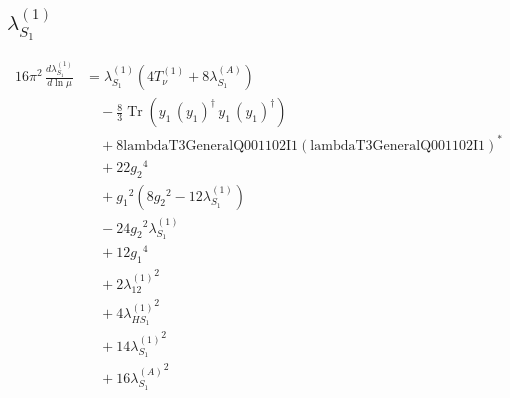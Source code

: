 \documentclass[10pt,a4paper]{article}
\begin{document}
\subsection*{$\lambda_{S_1}^{(1)}$}
\begin{align*}
16\pi^2\,\frac{d \lambda_{S_1}^{(1)}}{d\ln\mu} &={\lambda_{S_1}^{(1)}} (4 T_{\nu}^{(1)}+8 {\lambda_{S_1}^{(A)}}) \\
&\quad -\frac{8}{3} \operatorname{Tr}\!\left({y_1}\,\left({y_1}\right)^{\dagger}\,{y_1}\,\left({y_1}\right)^{\dagger}\right) \\
&\quad +8 \text{lambdaT3GeneralQ001102I1} \left(\text{lambdaT3GeneralQ001102I1}\right)^{*} \\
&\quad +22 {g_2}^4 \\
&\quad +{g_1}^2 \left(8 {g_2}^2-12 {\lambda_{S_1}^{(1)}}\right) \\
&\quad -24 {g_2}^2 {\lambda_{S_1}^{(1)}} \\
&\quad +12 {g_1}^4 \\
&\quad +2 {\lambda_{12}^{(1)}}^2 \\
&\quad +4 {\lambda_{HS_1}^{(1)}}^2 \\
&\quad +14 {\lambda_{S_1}^{(1)}}^2 \\
&\quad +16 {\lambda_{S_1}^{(A)}}^2 \\
\end{align*}
\end{document}
